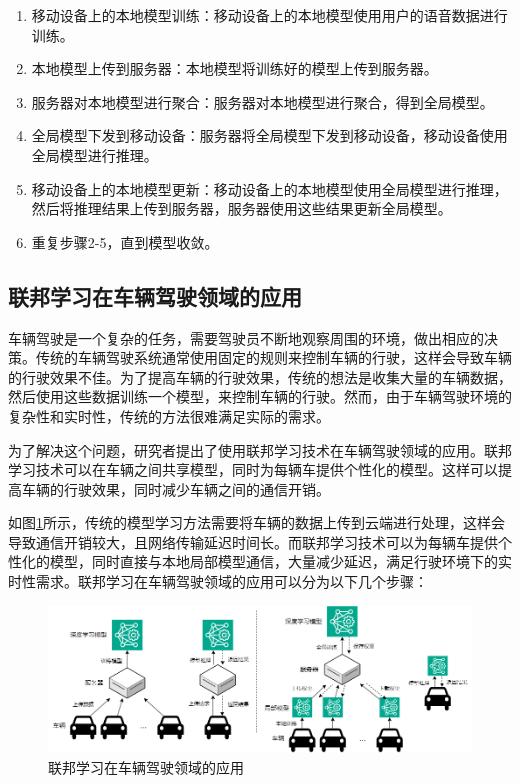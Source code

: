\begin{enumerate}
    \item 移动设备上的本地模型训练：移动设备上的本地模型使用用户的语音数据进行训练。
    \item 本地模型上传到服务器：本地模型将训练好的模型上传到服务器。
    \item 服务器对本地模型进行聚合：服务器对本地模型进行聚合，得到全局模型。
    \item 全局模型下发到移动设备：服务器将全局模型下发到移动设备，移动设备使用全局模型进行推理。
    \item 移动设备上的本地模型更新：移动设备上的本地模型使用全局模型进行推理，然后将推理结果上传到服务器，服务器使用这些结果更新全局模型。
    \item 重复步骤2-5，直到模型收敛。
\end{enumerate}

\subsection{联邦学习在车辆驾驶领域的应用}

车辆驾驶是一个复杂的任务，需要驾驶员不断地观察周围的环境，做出相应的决策。传统的车辆驾驶系统通常使用固定的规则来控制车辆的行驶，这样会导致车辆的行驶效果不佳。为了提高车辆的行驶效果，传统的想法是收集大量的车辆数据，然后使用这些数据训练一个模型，来控制车辆的行驶。然而，由于车辆驾驶环境的复杂性和实时性，传统的方法很难满足实际的需求。

为了解决这个问题，研究者提出了使用联邦学习技术在车辆驾驶领域的应用\cite{posner2021federated,du2020federated}。联邦学习技术可以在车辆之间共享模型，同时为每辆车提供个性化的模型。这样可以提高车辆的行驶效果，同时减少车辆之间的通信开销。

如图\ref{fig:car}所示，传统的模型学习方法需要将车辆的数据上传到云端进行处理，这样会导致通信开销较大，且网络传输延迟时间长。而联邦学习技术可以为每辆车提供个性化的模型，同时直接与本地局部模型通信，大量减少延迟，满足行驶环境下的实时性需求。联邦学习在车辆驾驶领域的应用可以分为以下几个步骤：

\begin{figure}[htbp]
    \centering
    \includegraphics[width=\textwidth]{images/car.png}
    \caption{联邦学习在车辆驾驶领域的应用}
    \label{fig:car}
\end{figure}

